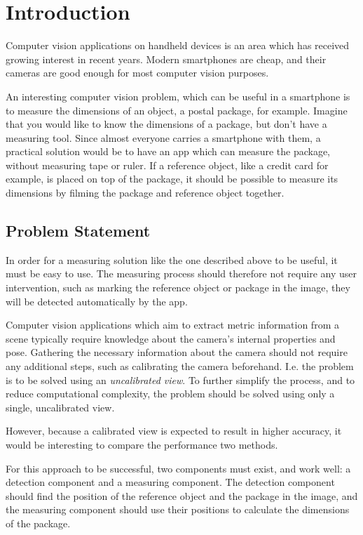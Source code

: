 \chapter{Introduction}
Computer vision applications on handheld devices is an area which has received growing interest in recent years. 
Modern smartphones are cheap, and their cameras are good enough for most computer vision purposes.

An interesting computer vision problem, which can be useful in a smartphone is to measure the dimensions of an object, a postal package, for example.
Imagine that you would like to know the dimensions of a package, but don't have a measuring tool.
Since almost everyone carries a smartphone with them, a practical solution would be to have an app which can measure the package, without measuring tape or ruler.
If a reference object, like a credit card for example, is placed on top of the package, it should be possible to measure its dimensions by filming the package and reference object together.

\section{Problem Statement}\label{problem-statement}
In order for a measuring solution like the one described above to be useful, it must be easy to use. 
The measuring process should therefore not require any user intervention, such as marking the reference object or package in the image, they will be detected automatically by the app.

Computer vision applications which aim to extract metric information from a scene typically require knowledge about the camera's internal properties and pose.
Gathering the necessary information about the camera should not require any additional steps, such as calibrating the camera beforehand.
I.e. the problem is to be solved using an \textit{uncalibrated view}.
To further simplify the process, and to reduce computational complexity, the problem should be solved using only a single, uncalibrated view.

However, because a calibrated view is expected to result in higher accuracy, it would be interesting to compare the performance two methods.

For this approach to be successful, two components must exist, and work well: a detection component and a measuring component.
The detection component should find the position of the reference object and the package in the image, and the measuring component should use their positions to calculate the dimensions of the package.

